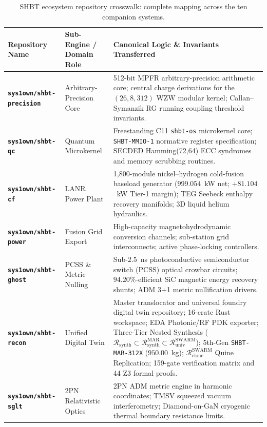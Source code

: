 \documentclass[11pt,onecolumn]{article}
\begin{document}
\begin{table}[!htbp]
\centering\small
\caption{SHBT ecosystem repository crosswalk: complete mapping across the ten companion systems.}
\label{tab:crosswalk}
\begin{tabularx}{\textwidth}{@{}p{4.2cm} p{4.2cm} X@{}}
\toprule
Repository Name & Sub-Engine / Domain Role & Canonical Logic \& Invariants Transferred \\
\midrule
\textbf{\texttt{sys1own/shbt-precision}} & Arbitrary-Precision Core & 512-bit MPFR arbitrary-precision arithmetic core; central charge derivations for the $(26, 8, 312)$ WZW modular kernel; Callan--Symanzik RG running coupling threshold invariants. \\
\addlinespace
\textbf{\texttt{sys1own/shbt-qc}} & Quantum Microkernel & Freestanding C11 \texttt{shbt-os} microkernel core; \texttt{SHBT-MMIO-1} normative register specification; SECDED Hamming(72,64) ECC syndromes and memory scrubbing routines. \\
\addlinespace
\textbf{\texttt{sys1own/shbt-cf}} & LANR Power Plant & 1,800-module nickel--hydrogen cold-fusion baseload generator ($999.054$~kW net; $+81.104$~kW Tier-1 margin); TEG Seebeck enthalpy recovery manifolds; 3D liquid helium hydraulics. \\
\addlinespace
\textbf{\texttt{sys1own/shbt-power}} & Fusion Grid Export & High-capacity magnetohydrodynamic conversion channels; sub-station grid interconnects; active phase-locking controllers. \\
\addlinespace
\textbf{\texttt{sys1own/shbt-ghost}} & PCSS \& Metric Nulling & Sub-$2.5$~ns photoconductive semiconductor switch (PCSS) optical crowbar circuits; $94.20\%$-efficient SiC magnetic energy recovery shunts; ADM 3+1 metric nullification drivers. \\
\addlinespace
\textbf{\texttt{sys1own/shbt-recon}} & Unified Digital Twin & Master translocator and universal foundry digital twin repository; 16-crate Rust workspace; EDA Photonic/RF PDK exporter; Three-Tier Nested Synthesis ($\mathcal{R}_{\text{synth}} \subset \mathcal{R}_{\text{synth}}^{\text{MAR}} \subset \mathcal{R}_{\text{univ}}^{\text{SWARM}}$); 5th-Gen \texttt{SHBT-MAR-312X} ($950.00$~kg); $\mathcal{R}_{\text{clone}}^{\text{SWARM}}$ Quine Replication; 159-gate verification matrix and 44 Z3 formal proofs. \\
\addlinespace
\textbf{\texttt{sys1own/shbt-sglt}} & 2PN Relativistic Optics & 2PN ADM metric engine in harmonic coordinates; TMSV squeezed vacuum interferometry; Diamond-on-GaN cryogenic thermal boundary resistance limits. \\

\end{tabularx}
\end{table}
\end{document}
